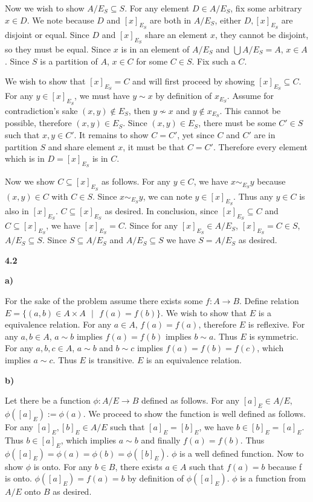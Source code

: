\documentclass{article}
\begin{document}
\medskip
Now we wish to show $A/E_S \subseteq S$. For any element $D \in A/E_S$, fix some arbitrary $x \in D$. We note because $D$ and $[x]_{E_S}$ are both in $A/E_S$, either $D,[x]_{E_S}$ are disjoint or equal. Since $D$ and $[x]_{E_S}$ share an element $x$, they cannot be disjoint, so they must be equal. Since $x$ is in an element of $A/E_S$ and $\bigcup A/E_S = A$, $x \in A$. Since $S$ is a partition of $A$, $x \in C$ for some $C \in S$. Fix such a $C$. 

\medskip
We wish to show that $[x]_{E_S} = C$ and will first proceed by showing $[x]_{E_S} \subseteq C$. For any $y \in [x]_{E_S}$, we must have $y \sim x$ by definition of $x_{E_S}$. Assume for contradiction's sake $(x,y) \notin E_S$, then $y \not \sim x$ and $y \notin x_{E_S}$. This cannot be possible, therefore $(x,y) \in E_S$. Since $(x,y) \in E_S$, there must be some $C' \in S$ such that $x, y \in C'$. It remains to show $C = C'$, yet since $C$ and $C'$ are in partition $S$ and share element $x$, it must be that $C = C'$. Therefore every element which is in $D = [x]_{E_S}$ is in $C$. 

\medskip
Now we show $C \subseteq [x]_{E_S}$ as follows. For any $y \in C$, we have $x \sim_{E_S} y$ because $(x,y) \in C$ with $C \in S$. Since $x \sim_{E_S} y$, we can note $y \in [x]_{E_S}$. Thus any $y \in C$ is also in $[x]_{E_S}$. $C \subseteq [x]_{E_S}$ as desired. In conclusion, since $[x]_{E_S} \subseteq C$ and $C \subseteq [x]_{E_S}$, we have $[x]_{E_S} = C$. Since for any $[x]_{E_S} \in A/E_S$, $[x]_{E_S} = C \in S$, $A/E_S \subseteq S$. Since $S \subseteq A/E_S$ and $A/E_S \subseteq S$ we have $S = A/E_S$ as desired.

\medskip
\textbf{4.2}
\medskip

\medskip
\textbf{a)}
\medskip

For the sake of the problem assume there exists some $f: A \xrightarrow{} B$. Define relation $E = \{(a,b) \in A \times A \text{ } | \text{ } f(a) = f(b)\}$. We wish to show that $E$ is a equivalence relation. For any $a \in A$, $f(a) = f(a)$, therefore $E$ is reflexive. For any $a,b \in A$, $a \sim b$ implies $f(a) = f(b)$ implies $b \sim a$. Thus $E$ is symmetric. For any $a,b,c \in A$, $a \sim b$ and $b \sim c$ implies $f(a) = f(b) = f(c)$, which implies $a \sim c$. Thus $E$ is transitive. $E$ is an equivalence relation.

\medskip
\textbf{b)}
\medskip

Let there be a function $\phi: A/E \xrightarrow{} B$ defined as follows. For any $[a]_{E} \in A/E$, $\phi([a]_{E}) := \phi(a)$. We proceed to show the function is well defined as follows. For any $[a]_{E}, [b]_{E} \in A/E$ such that $[a]_{E} = [b]_{E}$, we have $b \in [b]_{E} = [a]_{E}$. Thus $b \in [a]_{E}$, which implies $a \sim b$ and finally $f(a) = f(b)$. Thus $\phi([a]_{E}) = \phi(a) = \phi(b) = \phi([b]_{E})$. $\phi$ is a well defined function. Now to show $\phi$ is onto. For any $b \in B$, there exists $a \in A$ such that $f(a) = b$ because f is onto. $\phi([a]_{E}) = f(a) = b$ by definition of $\phi([a]_{E})$. $\phi$ is a function from $A/E$ onto $B$ as desired.
\end{document}

